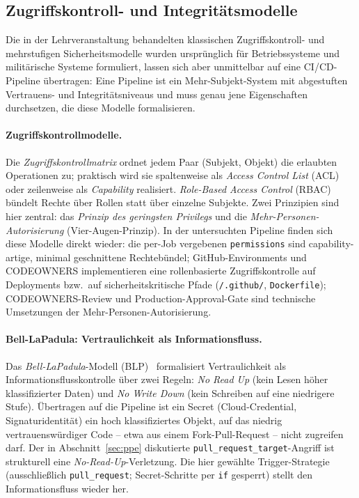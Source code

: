 \documentclass[12pt, a4paper]{scrartcl}
\begin{document}
\subsection{Zugriffskontroll- und Integritätsmodelle}\label{sec:acmodels}
Die in der Lehrveranstaltung behandelten klassischen Zugriffskontroll-
und mehrstufigen Sicherheitsmodelle wurden ursprünglich für
Betriebssysteme und militärische Systeme formuliert, lassen sich aber
unmittelbar auf eine CI/CD-Pipeline übertragen: Eine Pipeline ist ein
Mehr-Subjekt-System mit abgestuften Vertrauens- und Integritätsniveaus
und muss genau jene Eigenschaften durchsetzen, die diese Modelle
formalisieren.

\paragraph{Zugriffskontrollmodelle.}
Die \emph{Zugriffskontrollmatrix} ordnet jedem Paar (Subjekt, Objekt)
die erlaubten Operationen zu; praktisch wird sie spaltenweise als
\emph{Access Control List} (ACL) oder zeilenweise als \emph{Capability}
realisiert. \emph{Role-Based Access Control} (RBAC) bündelt Rechte über
Rollen statt über einzelne Subjekte. Zwei Prinzipien sind hier zentral:
das \emph{Prinzip des geringsten Privilegs} und die
\emph{Mehr-Personen-Autorisierung} (Vier-Augen-Prinzip). In der
untersuchten Pipeline finden sich diese Modelle direkt wieder: die
per-Job vergebenen \texttt{permissions} sind capability-artige, minimal
geschnittene Rechtebündel; GitHub-Environments und CODEOWNERS
implementieren eine rollenbasierte Zugriffskontrolle auf Deployments
bzw.\ auf sicherheitskritische Pfade (\texttt{/.github/},
\texttt{Dockerfile}); CODEOWNERS-Review und Production-Approval-Gate
sind technische Umsetzungen der Mehr-Personen-Autorisierung.

\paragraph{Bell-LaPadula: Vertraulichkeit als Informationsfluss.}
Das \emph{Bell-LaPadula}-Modell (BLP)~\cite{blp,anderson} formalisiert
Vertraulichkeit als Informationsflusskontrolle über zwei Regeln:
\emph{No Read Up} (kein Lesen höher klassifizierter Daten) und
\emph{No Write Down} (kein Schreiben auf eine niedrigere Stufe).
Übertragen auf die Pipeline ist ein Secret (Cloud-Credential,
Signaturidentität) ein hoch klassifiziertes Objekt, auf das niedrig
vertrauenswürdiger Code -- etwa aus einem Fork-Pull-Request -- nicht
zugreifen darf. Der in Abschnitt~\ref{sec:ppe} diskutierte
\texttt{pull\_request\_target}-Angriff ist strukturell eine
\emph{No-Read-Up}-Verletzung. Die hier gewählte Trigger-Strategie
(ausschließlich \texttt{pull\_request}; Secret-Schritte per \texttt{if}
gesperrt) stellt den Informationsfluss wieder her.
\end{document}
